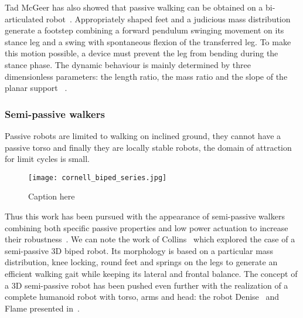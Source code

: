 Tad McGeer has also showed that passive walking can be obtained on a bi-articulated robot~\cite{mcgeer1992principles}. Appropriately shaped feet  and a judicious mass distribution generate a footstep combining a forward pendulum swinging movement on its stance leg and a swing with spontaneous flexion of the transferred leg. To make this motion possible, a device must prevent the leg from bending during the stance phase.
The dynamic behaviour is mainly determined by three dimensionless parameters: the length ratio, the mass ratio and the slope of the planar support ~\cite{Garcia1998}.


\subsubsection{Semi-passive walkers} %
Passive robots are limited to walking on inclined ground, they cannot have a passive torso and finally they are locally stable robots, the domain of attraction for limit cycles is small.

\begin{figure}[tb]
    \begin{center}
        \texttt{[image: cornell\_biped\_series.jpg]}
    \end{center}
    \caption{Caption here}
    \label{fig:figure1}
\end{figure}

Thus this work has been pursued with the appearance of semi-passive walkers combining both specific passive properties and low power actuation to increase their robustness~\cite{Anderson2005}. We can note the work of Collins~\cite{collins2005bipedal} which explored the case of a semi-passive 3D biped robot. Its morphology is based on a particular mass distribution, knee locking, round feet and springs on the legs to generate an efficient walking gait while keeping its lateral and frontal balance. The concept of a 3D semi-passive robot has been pushed even further with the realization of a complete humanoid robot with torso, arms and head: the robot Denise~\cite{wisse2005three} and Flame presented in~\cite{Hobbelen2008}.



